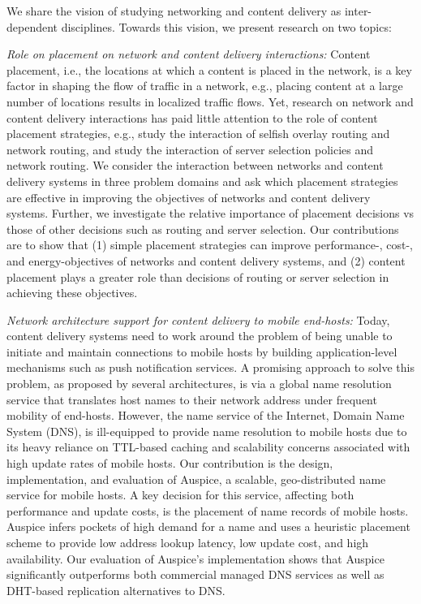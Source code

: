 {%


We share the vision of studying networking and content delivery as inter-dependent disciplines. Towards this vision, we present research on two topics: 

\emph{Role on placement on network and content delivery interactions:}  
Content placement, i.e., the locations at which a content is placed in the network, is a key factor in shaping the flow of traffic in a network, e.g., placing content at a large number of locations results in localized traffic flows. Yet, research on network and content delivery interactions has paid little attention to the role of content placement strategies, e.g., \cite{a,b,c} study the interaction of selfish overlay routing and network routing, and \cite{a,b,c} study the interaction of server selection policies and network routing. We consider the interaction between networks and content delivery systems in three problem domains and ask which placement strategies are effective in improving the objectives of networks and content delivery systems.  Further, we investigate the relative importance of  placement decisions vs those of other decisions such as routing and server selection. Our contributions are to show that (1) simple placement strategies can improve performance-, cost-, and energy-objectives of networks and content delivery systems, and (2)  content placement plays a greater role than decisions of routing or server selection in achieving these objectives.


 
\emph{Network architecture support for content delivery to mobile end-hosts:}
Today, content delivery systems need to work around the problem of being unable to initiate and maintain connections to mobile hosts by building application-level mechanisms such as push notification services. A promising approach to solve this problem, as proposed by several architectures, is via a global name resolution service that translates host names to their network address under frequent  mobility of end-hosts. However, the name service of  the Internet,  Domain Name System (DNS), is ill-equipped to provide name resolution to mobile hosts due to its heavy reliance on TTL-based caching and scalability concerns associated with high update rates of mobile hosts. Our contribution is the design, implementation, and evaluation of Auspice, a scalable, geo-distributed name service for mobile hosts.  A key decision for this service, affecting both performance and update costs, is the placement of name records of mobile hosts. Auspice infers pockets of high demand for a name and uses a heuristic placement scheme to provide low address lookup latency, low update cost, and high availability. Our evaluation of Auspice's implementation  shows that Auspice significantly outperforms both commercial managed DNS services as well as DHT-based replication alternatives to DNS.
}
